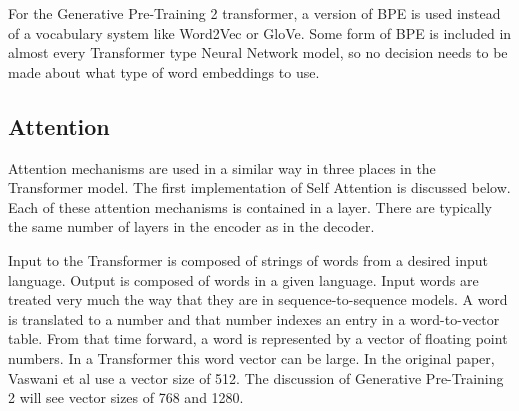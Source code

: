 For the Generative Pre-Training 2 transformer, a version of BPE is used instead of a vocabulary system like Word2Vec or GloVe. Some form of BPE is included in almost every Transformer type Neural Network model, so no decision needs to be made about what type of word embeddings to use.

\subsection{Attention}
Attention mechanisms are used in a similar way in three places in the Transformer model. The first implementation of Self Attention is discussed below. Each of these attention mechanisms is contained in a layer. There are typically the same number of layers in the encoder as in the decoder.

Input to the Transformer is composed of strings of words from a desired input language. Output is composed of words in a given language. Input words are treated very much the way that they are in sequence-to-sequence models. A word is translated to a number and that number indexes an entry in a word-to-vector table. From that time forward, a word is represented by a vector of floating point numbers. In a Transformer this word vector can be large. In the original paper, Vaswani et al \cite{Vaswani2017AttentionIA} use a vector size of 512. The discussion of Generative Pre-Training 2 will see vector sizes of 768 and 1280.


